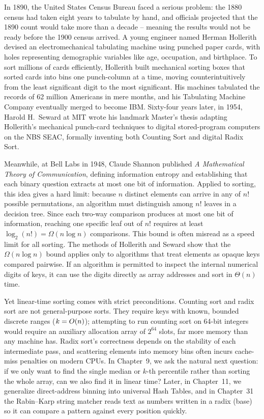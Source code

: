 \begin{historybox}
In 1890, the United States Census Bureau faced a serious problem: the 1880 census had taken
eight years to tabulate by hand, and officials projected that the 1890 count would take more than a
decade -- meaning the results would not be ready before the 1900 census arrived. A young engineer
named Herman Hollerith devised an electromechanical tabulating machine using punched paper cards,
with holes representing demographic variables like age, occupation, and birthplace. To sort millions
of cards efficiently, Hollerith built mechanical sorting boxes that sorted cards into bins one
punch-column at a time, moving counterintuitively from the least significant digit to the most
significant. His machines tabulated the records of 62 million Americans in mere months, and his
Tabulating Machine Company eventually merged to become IBM. Sixty-four years later, in 1954, Harold
H.\ Seward at MIT wrote his landmark Master's thesis adapting Hollerith's mechanical punch-card
techniques to digital stored-program computers on the NBS SEAC, formally inventing both Counting
Sort and digital Radix Sort.

Meanwhile, at Bell Labs in 1948, Claude Shannon published \emph{A Mathematical Theory of
Communication}, defining information entropy and establishing that each binary question extracts at
most one bit of information. Applied to sorting, this idea gives a hard
limit: because $n$ distinct elements can arrive in any of $n!$ possible permutations, an algorithm
must distinguish among $n!$ leaves in a decision tree. Since each two-way comparison produces at
most one bit of information, reaching one specific leaf out of $n!$ requires at least
$\log_2(n!) = \Omega(n \log n)$ comparisons. This bound is often
misread as a speed limit for all sorting. The methods of Hollerith and Seward show that the
$\Omega(n \log n)$ bound applies only to algorithms that treat elements as opaque
keys compared pairwise. If an algorithm is permitted to inspect the internal numerical digits
of keys, it can use the digits directly as array addresses and sort in $\Theta(n)$ time.

Yet linear-time sorting comes with strict preconditions. Counting sort and radix sort are
not general-purpose sorts. They require keys with known, bounded discrete
ranges ($k = O(n)$); attempting to run counting sort on 64-bit integers would require an auxiliary
allocation array of $2^{64}$ slots, far more memory than any machine has. Radix sort's
correctness depends on the stability of each intermediate pass, and scattering elements into
memory bins often incurs cache-miss penalties on modern CPUs. In Chapter~9, we ask the natural
next question: if we only want to find the single median or $k$-th percentile rather than sorting the
whole array, can we also find it in linear time? Later, in Chapter~11, we generalize direct-address
binning into universal Hash Tables, and in Chapter~31 the Rabin--Karp string matcher reads text as numbers
written in a radix (base) so it can compare a pattern against every position quickly.
\end{historybox}

